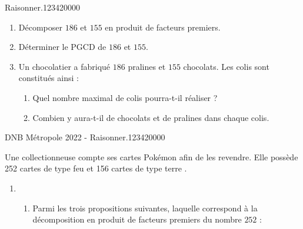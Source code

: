 

\begin{pageAuto} 




\begin{ExoAuto}{Raisonner.}{1234}{2}{0}{0}{0}{0}

\begin{enumerate}
\item Décomposer $186$ et $155$ en produit de facteurs premiers. 
\item Déterminer le PGCD de $186$ et $155$. 
\item Un chocolatier a fabriqué $186$ pralines et $155$ chocolats.
Les colis sont constitués ainsi :
\begin{enumerate}
\item Quel nombre maximal de colis pourra-t-il réaliser ?  
\item Combien y aura-t-il de chocolats et de pralines dans chaque colis.   
\end{enumerate}
\end{enumerate}

\end{ExoAuto}


\begin{ExoAuto}{DNB Métropole 2022 - Raisonner.}{1234}{2}{0}{0}{0}{0}

Une collectionneuse compte ses cartes Pokémon afin de les revendre. Elle possède 252 cartes de type \og feu \fg{} et 156 cartes de type \og terre \fg.
\begin{enumerate}
\item  \begin{enumerate}
\item  Parmi les trois propositions suivantes, laquelle correspond à la décomposition en produit de facteurs premiers du nombre $252$ :


\end{enumerate}
\end{enumerate}
\end{ExoAuto}
\end{pageAuto}
